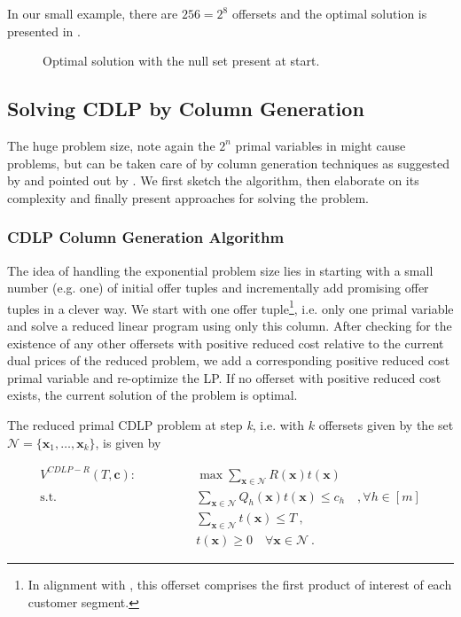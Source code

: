 In our small example, there are $256 = 2^8$ offersets and the optimal solution is presented in .

\begin{figure}[ht]
	\caption{Optimal solution with the null set present at start.\label{txt-CDLP-Stefan}}
	
\end{figure}


\subsection{Solving CDLP by Column Generation}

The huge problem size, note again the $2^n$ primal variables in  might cause problems, but can be taken care of by column generation techniques as suggested by \cite{GGallego.} and pointed out by \cite{Bront.2009}. We first sketch the algorithm, then elaborate on its complexity and finally present approaches for solving the problem.

\subsubsection{CDLP Column Generation Algorithm}

The idea of handling the exponential problem size lies in starting with a small number (e.g. one) of initial offer tuples and incrementally add promising offer tuples in a clever way. We start with one offer tuple\footnote{In alignment with \cite{Bront.2009}, this offerset comprises the first product of interest of each customer segment.}, i.e. only one primal variable and solve a reduced linear program using only this column. After checking for the existence of any other offersets with positive reduced cost relative to the current dual prices of the reduced problem, we add a corresponding positive reduced cost primal variable and re-optimize the LP. If no offerset with positive reduced cost exists, the current solution of the problem is optimal.

The reduced primal CDLP problem at step \emph{k}, i.e. with $k$ offersets given by the set $\mathcal{N}=\{\mathbf{x}_1, \dots, \mathbf{x}_k\}$, is given by

\begin{align}
V^{CDLP-R}(T, \boldsymbol{c}): \qquad\qquad & \max \sum_{\boldsymbol{x}\in \mathcal{N}} R(\boldsymbol{x}) t(\boldsymbol{x})\label{eq:CDLPr}\\
\text{s.t. } & \sum_{\boldsymbol{x}\in \mathcal{N}} Q_h(\boldsymbol{x}) t(\boldsymbol{x}) \leq c_h \quad, \forall h \in [m]\\
& \sum_{\boldsymbol{x}\in \mathcal{N}} t(\boldsymbol{x}) \leq T~,\\
& t(\boldsymbol{x}) \geq 0 \quad \forall \boldsymbol{x} \in \mathcal{N}~.
\end{align}


